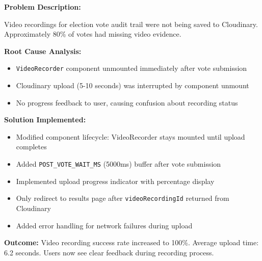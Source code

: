 \documentclass[12pt,a4paper]{article}
\begin{document}
\begin{tcolorbox}[colback=LightGold, colframe=Gold, title=\textbf{Challenge 3: Vote Audit Video Recording Failures}, fonttitle=\bfseries]

\textbf{Problem Description:}

Video recordings for election vote audit trail were not being saved to Cloudinary. Approximately 80\% of votes had missing video evidence.

\textbf{Root Cause Analysis:}
\begin{itemize}[noitemsep]
  \item \texttt{VideoRecorder} component unmounted immediately after vote submission
  \item Cloudinary upload (5-10 seconds) was interrupted by component unmount
  \item No progress feedback to user, causing confusion about recording status
\end{itemize}

\textbf{Solution Implemented:}
\begin{itemize}[noitemsep]
  \item Modified component lifecycle: VideoRecorder stays mounted until upload completes
  \item Added \texttt{POST\_VOTE\_WAIT\_MS} (5000ms) buffer after vote submission
  \item Implemented upload progress indicator with percentage display
  \item Only redirect to results page after \texttt{videoRecordingId} returned from Cloudinary
  \item Added error handling for network failures during upload
\end{itemize}

\textbf{Outcome:} Video recording success rate increased to 100\%. Average upload time: 6.2 seconds. Users now see clear feedback during recording process.
\end{tcolorbox}

\vspace{8pt}
\end{document}
